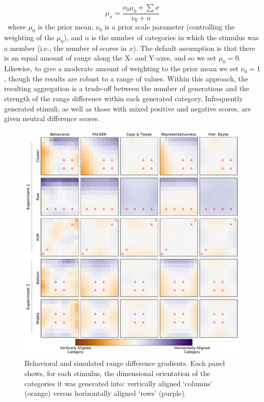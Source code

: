 \documentclass[pdflatex,sn-apa]{sn-jnl}%
\theoremstyle{thmstyleone}%
\theoremstyle{thmstyletwo}%
\theoremstyle{thmstylethree}%
\begin{document}
\begin{equation} \mu_x = \dfrac { \nu_0 \mu_0 + \sum{x} } { \nu_0 + n }
\label{eq:rangediff-bayes}
\end{equation} \ where $\mu_0$ is the prior mean, $\nu_0$ is a prior scale
parameter (controlling the weighting of the $\mu_0$), and $n$ is the number of
categories in which the stimulus was a member (i.e., the number of scores in
$x$). The default assumption is that there is an equal amount of range along the
X- and Y-axes, and so we set $\mu_0 = 0$. Likewise, to give a moderate amount of
weighting to the prior mean we set $\nu_0 = 1$, though the results are robust to
a range of values. Within this approach, the resulting aggregation is a
trade-off between the number of generations and the strength of the range
difference within each generated category. Infrequently generated stimuli, as
well as those with mixed positive and negative scores, are given neutral
difference scores.

\begin{figure}[p]
    \begin{center} 
      \includegraphics[width=\textwidth]{figs/range-diff-gradients.pdf}
      \caption{Behavioral and simulated range difference gradients. Each panel
        shows, for each stimulus, the dimensional orientation of the categories
        it was generated into: vertically aligned `columns' (orange) versus
        horizontally aligned `rows' (purple).}
      \label{fig:range-diff-gradients}
    \end{center}
\end{figure}
\end{document}
